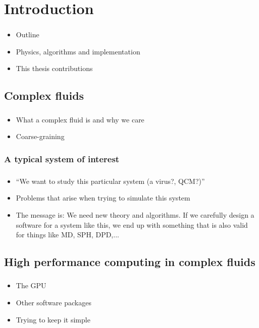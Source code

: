 \documentclass{beamer}
\begin{document}
\begin{frame}
\begin{columns}
\begin{column}{0.5\linewidth}
\begin{figure}
      \end{figure}
    \end{column}
  \end{columns}
\end{frame}


\section{Introduction}
\begin{frame}
  \frametitle{\insertsection}
  \begin{itemize}
  \item Outline
  \item Physics, algorithms and implementation
  \item This thesis contributions
  \end{itemize}
\end{frame}

\subsection{Complex fluids}
\begin{frame}
  \frametitle{\insertsubsectionnavigation{\linewidth}}
  \begin{itemize}
  \item What a complex fluid is and why we care
  \item Coarse-graining
  \end{itemize}
\end{frame}
\subsubsection{A typical system of interest}
\begin{frame}
  \frametitle{\insertsubsectionnavigation{\linewidth}} 
  \framesubtitle{\insertsubsubsection}
  \begin{itemize}
  \item ``We want to study this particular system (a virus?, QCM?)''
  \item Problems that arise when trying to simulate this system
  \item The message is: We need new theory and algorithms. If we carefully design a software for a system like this, we end up with something that is also valid for things like MD,  SPH, DPD,...
  \end{itemize}
\end{frame}
\subsection{High performance computing in complex fluids}
\begin{frame}
  \frametitle{\insertsubsectionnavigation{\linewidth}} 
  \begin{itemize}
  \item The GPU
  \item Other software packages
  \item Trying to keep it simple
  \end{itemize}
\end{frame}
\end{document}
